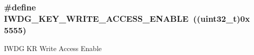 \subsubsection[{\texorpdfstring{I\+W\+D\+G\+\_\+\+K\+E\+Y\+\_\+\+W\+R\+I\+T\+E\+\_\+\+A\+C\+C\+E\+S\+S\+\_\+\+E\+N\+A\+B\+LE}{IWDG_KEY_WRITE_ACCESS_ENABLE}}]{\setlength{\rightskip}{0pt plus 5cm}\#define I\+W\+D\+G\+\_\+\+K\+E\+Y\+\_\+\+W\+R\+I\+T\+E\+\_\+\+A\+C\+C\+E\+S\+S\+\_\+\+E\+N\+A\+B\+LE~((uint32\+\_\+t)0x5555)}\hypertarget{group___i_w_d_g___registers___bit_mask_ga90fbb0a5e42ed25b44c0330ad75724e6}{}\label{group___i_w_d_g___registers___bit_mask_ga90fbb0a5e42ed25b44c0330ad75724e6}
I\+W\+DG KR Write Access Enable 